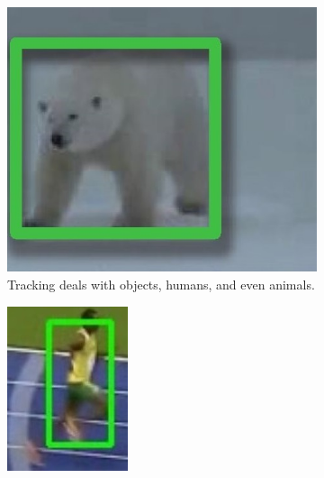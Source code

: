 \begin{figure}[!h]
\begin{subfigure}[!h]{0.54\textwidth}
		\label{fig:challenge_deformation}
	\end{subfigure}
	\begin{subfigure}[!h]{0.24\textwidth}
		\includegraphics[width=\linewidth]{images/tracking/challenge_differentSubject}
		\caption{Tracking deals with objects, humans, and even animals.}
		\label{fig:challenge_differentSubject}
	\end{subfigure}
	\begin{subfigure}[!h]{0.19\textwidth}
		\includegraphics[width=\linewidth]{images/tracking/challenge_blurred}

\end{subfigure}
\end{figure}
